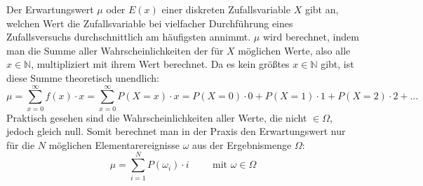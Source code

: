 \begin{figure}[h!]
	\centering
\end{figure}


Der Erwartungswert $\mu$ oder $E(x)$ einer diskreten Zufallsvariable $X$ gibt an, welchen Wert die Zufallsvariable bei vielfacher Durchf\"{u}hrung eines Zufallsversuchs durchschnittlich am h\"{a}ufigsten annimmt. $\mu$ wird berechnet, indem man die Summe aller Wahrscheinlichkeiten der f\"{u}r $X$ m\"{o}glichen Werte, also alle $x \in \mathbb{N}$, multipliziert mit ihrem Wert berechnet. Da es kein gr\"{o}\ss{}tes $x \in \mathbb{N}$ gibt, ist diese Summe theoretisch unendlich: $$\mu = \sum_{x=0}^{\infty} f(x) \cdot x = \sum_{x=0}^{\infty} P(X = x) \cdot x = P(X = 0) \cdot 0 + P(X = 1) \cdot 1 + P(X = 2) \cdot 2 + \dots$$ Praktisch gesehen sind die Wahrscheinlichkeiten aller Werte, die nicht $\in \Omega$, jedoch gleich null. Somit berechnet man in der Praxis den Erwartungswert nur f\"{u}r die $N$ m\"{o}glichen Elementarereignisse $\omega$ aus der Ergebnismenge $\Omega$: $$\mu = \sum_{i=1}^{N} P(\omega_i) \cdot i \hspace{1cm} \text{mit } \omega \in \Omega$$


